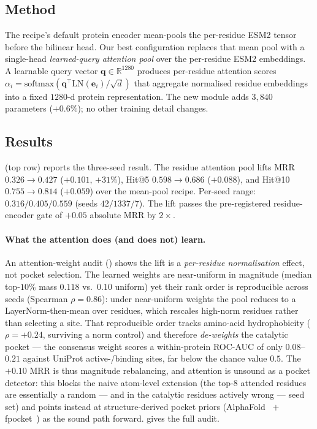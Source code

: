 \documentclass[11pt,a4paper]{article}
\begin{document}
\subsection{Method}
The recipe's default protein encoder mean-pools the per-residue ESM2 tensor
before the bilinear head. Our best configuration replaces that mean pool with a
single-head \emph{learned-query attention pool} over the per-residue ESM2
embeddings.
A learnable query vector $\mathbf{q} \in \mathbb{R}^{1280}$ produces
per-residue attention scores
$\alpha_{i} = \mathrm{softmax}(\mathbf{q}^{\top}\mathrm{LN}(\mathbf{e}_{i})/\sqrt{d})$
that aggregate normalised residue embeddings into a fixed $1280$-d
protein representation. The new module adds $3{,}840$ parameters
($+0.6\%$); no other training detail changes.

\subsection{Results}

 (top row) reports the three-seed result. The residue
attention pool lifts MRR $0.326 \to 0.427$ ($+0.101$, $+31\%$), Hit@5
$0.598 \to 0.686$ ($+0.088$), and Hit@10 $0.755 \to 0.814$ ($+0.059$) over the
mean-pool recipe. Per-seed range: $0.316 / 0.405 / 0.559$ (seeds
$42 / 1337 / 7$). The lift passes the pre-registered residue-encoder gate of
$+0.05$ absolute MRR by $2\times$.

\paragraph{What the attention does (and does not) learn.}
An attention-weight audit () shows the lift is a
\emph{per-residue normalisation} effect, not pocket selection. The learned
weights are near-uniform in magnitude (median top-$10\%$ mass $0.118$ vs.\
$0.10$ uniform) yet their rank order is reproducible across seeds (Spearman
$\rho = 0.86$): under near-uniform weights the pool reduces to a
LayerNorm-then-mean over residues, which rescales high-norm residues rather
than selecting a site. That reproducible order tracks amino-acid
hydrophobicity ($\rho = +0.24$, surviving a norm control) and therefore
\emph{de-weights} the catalytic pocket --- the consensus weight scores a
within-protein ROC-AUC of only $0.08$--$0.21$ against UniProt active-/binding
sites, far below the chance value $0.5$. The $+0.10$ MRR is thus magnitude
rebalancing, and attention is unsound as a pocket detector: this blocks the
naive atom-level extension (the top-$8$ attended residues are essentially a
random --- and in the catalytic residues actively wrong --- seed set) and
points instead at structure-derived pocket priors
(AlphaFold~\citep{jumper2021alphafold} $+$ fpocket~\citep{leguilloux2009fpocket})
as the sound path forward. \Cref{sec:attn} gives the full audit.
\end{document}
